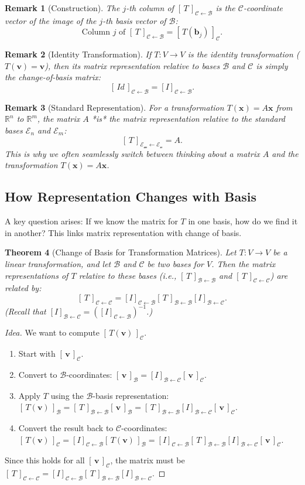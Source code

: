 \documentclass[11pt, a4paper]{article}
\theoremstyle{mytheoremstyle}
\newtheorem{theorem}{Theorem}[section]
\theoremstyle{mydefstyle}
\newtheorem{remark}[theorem]{Remark}
\newcommand{\R}{\mathbb{R}}      %
\newcommand{\B}{\mathcal{B}}    %
\newcommand{\C}{\mathcal{C}}    %
\newcommand{\E}{\mathcal{E}}    %
\newcommand{\vb}{\mathbf{v}}     %
\newcommand{\xb}{\mathbf{x}}     %
\newcommand{\bb}{\mathbf{b}}     %
\newcommand{\coord}[2]{[\,#1\,]_{\mathcal{#2}}} %
\newcommand{\matrixrep}[3]{[\,#1\,]_{\mathcal{#2} \leftarrow \mathcal{#3}}} %
\newcommand{\changebasis}[2]{[I]_{\mathcal{#1} \leftarrow \mathcal{#2}}} %
\begin{document}
\begin{remark}[Construction]
The $j$-th column of $\matrixrep{T}{C}{B}$ is the $\C$-coordinate vector of the image of the $j$-th basis vector of $\B$:
\[ \text{Column } j \text{ of } \matrixrep{T}{C}{B} = \coord{T(\bb_j)}{C}. \]
\end{remark}

\begin{remark}[Identity Transformation]
If $T: V \to V$ is the identity transformation ($T(\vb) = \vb$), then its matrix representation relative to bases $\B$ and $\C$ is simply the change-of-basis matrix:
\[ \matrixrep{Id}{C}{B} = \changebasis{C}{B}. \]
\end{remark}

\begin{remark}[Standard Representation]
For a transformation $T(\xb) = A\xb$ from $\R^n$ to $\R^m$, the matrix $A$ *is* the matrix representation relative to the standard bases $\E_n$ and $\E_m$:
\[ \matrixrep{T}{E_m}{E_n} = A. \]
This is why we often seamlessly switch between thinking about a matrix $A$ and the transformation $T(\xb)=A\xb$.
\end{remark}

\subsection{How Representation Changes with Basis}

A key question arises: If we know the matrix for $T$ in one basis, how do we find it in another? This links matrix representation with change of basis.

\begin{theorem}[Change of Basis for Transformation Matrices]
Let $T: V \to V$ be a linear transformation, and let $\B$ and $\C$ be two bases for $V$. Then the matrix representations of $T$ relative to these bases (i.e., $\matrixrep{T}{B}{B}$ and $\matrixrep{T}{C}{C}$) are related by:
\[ \matrixrep{T}{C}{C} = \changebasis{C}{B} \matrixrep{T}{B}{B} \changebasis{B}{C}. \]
(Recall that $\changebasis{B}{C} = (\changebasis{C}{B})^{-1}$.)
\end{theorem}

\begin{proof}[Idea]
We want to compute $\coord{T(\vb)}{C}$.
\begin{enumerate}
    \item Start with $\coord{\vb}{C}$.
    \item Convert to $\B$-coordinates: $\coord{\vb}{B} = \changebasis{B}{C} \coord{\vb}{C}$.
    \item Apply $T$ using the $\B$-basis representation: $\coord{T(\vb)}{B} = \matrixrep{T}{B}{B} \coord{\vb}{B} = \matrixrep{T}{B}{B} \changebasis{B}{C} \coord{\vb}{C}$.
    \item Convert the result back to $\C$-coordinates: $\coord{T(\vb)}{C} = \changebasis{C}{B} \coord{T(\vb)}{B} = \changebasis{C}{B} \matrixrep{T}{B}{B} \changebasis{B}{C} \coord{\vb}{C}$.
\end{enumerate}
Since this holds for all $\coord{\vb}{C}$, the matrix must be $\matrixrep{T}{C}{C} = \changebasis{C}{B} \matrixrep{T}{B}{B} \changebasis{B}{C}$.
\end{proof}
\end{document}
